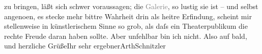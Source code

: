 \begin{ledgroupsized}[t]{13cm}
                    zu bringen, läßt sich schwer voraussagen; die \textcolor{gray}{Galerie}, so
                    lustig sie ist – und selbst angeno{\geminationm}en, es stecke
                    mehr bittre Wahrheit drin als heitre Erfindung, scheint mir stellenweise in
                    künstlerischem Sinne so grob, als daſs ein Theaterpublikum die rechte Freude
                    daran haben sollte.\pend
           \pstart Aber unfehlbar bin ich nicht. Also auf bald, und herzliche Grüße\hspace*{1.5em}Ihr sehr ergebner\spacefill\mbox{ArthSchnitzler}\pend{}\endnumbering{}\end{ledgroupsized}  \newcommand{\dateiname}{L02512}\newcommand{\titel}{Arthur Schnitzler an Robert Adam, 14. 6. 1929}\newcommand{\editorInnen}{Martin Anton Müller und Gerd-Hermann Susen}
      